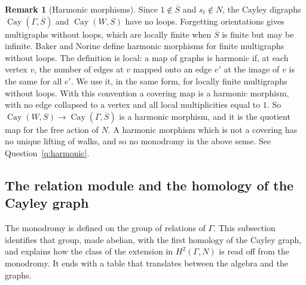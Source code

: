 \documentclass[12pt,letterpaper]{article}
\numberwithin{equation}{section}
\theoremstyle{plain}
\theoremstyle{definition}
\newtheorem{remark}[theorem]{Remark}
\DeclareMathOperator{\Cay}{Cay}
\begin{document}
\begin{remark}[Harmonic morphisms]\label{rem:harmonic}
Since $1\notin\overline{S}$ and $s_t\notin N$, the Cayley digraphs
$\Cay(\Gamma,\overline{S})$ and $\Cay(W,S)$ have no loops. Forgetting
orientations gives multigraphs without loops, which are locally finite
when $\overline{S}$ is finite but may be infinite. Baker and Norine
\cite{BN09} define harmonic morphisms for finite multigraphs without loops.
The definition is local: a map of graphs is harmonic if, at each vertex
$v$, the number of edges at $v$ mapped onto an edge $e'$ at the image of
$v$ is the same for all $e'$. We use it, in the same form, for locally
finite multigraphs without loops. With this convention a covering map is
a harmonic morphism, with no edge collapsed to a vertex and all local
multiplicities equal to $1$. So $\Cay(W,S)\to\Cay(\Gamma,\overline{S})$
is a harmonic morphism, and it is the quotient map for the free action of
$N$. A harmonic morphism which is not a covering has no unique lifting of
walks, and so no monodromy in the above sense. See
Question~\ref{q:harmonic}.
\end{remark}

\subsection{The relation module and the homology of the Cayley graph}\label{ss:relmod}

The monodromy is defined on the group of relations of $\Gamma$. This
subsection identifies that group, made abelian, with the first homology
of the Cayley graph, and explains how the class of the extension in
$H^2(\Gamma,N)$ is read off from the monodromy. It ends with a table that
translates between the algebra and the graphs.
\end{document}
